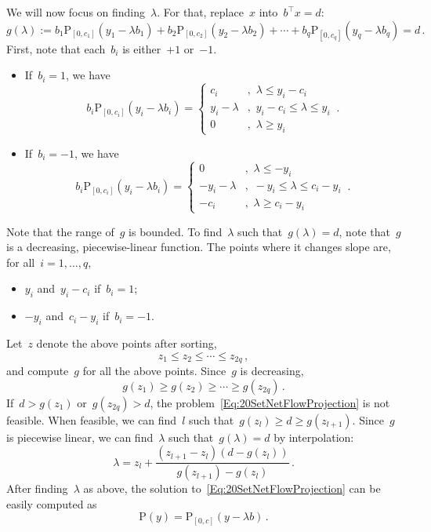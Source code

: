 \documentclass[letter,10pt]{article}
\theoremstyle{definition}
\theoremstyle{nonumberplain}
\begin{document}
		We will now focus on finding~$\lambda$. For that, replace~$x$ into~$b^\top x = d$:
		$$
			g(\lambda) := b_1\text{P}_{[0,c_1]}(y_1 - \lambda b_1) + b_2\text{P}_{[0,c_2]}(y_2 - \lambda b_2)
			+ \cdots + b_q\text{P}_{[0,c_q]}(y_q - \lambda b_q) = d\,.
		$$
		First, note that each~$b_i$ is either~$+1$ or~$-1$.
		\begin{itemize}
			\item If~$b_i=1$, we have
					$$
						b_i\text{P}_{[0,c_i]}(y_i - \lambda b_i) =
						\left\{
							\begin{array}{ll}
								c_i &,\,\, \lambda \leq y_i - c_i \\
								y_i - \lambda &,\,\, y_i - c_i \leq \lambda \leq y_i \\
								0 &,\,\, \lambda \geq y_i
							\end{array}
						\right.
						\,.
					$$
			\item If~$b_i = -1$, we have
				  $$
						b_i\text{P}_{[0,c_i]}(y_i - \lambda b_i) =
						\left\{
							\begin{array}{ll}
								0 &,\,\, \lambda \leq -y_i \\
								-y_i - \lambda &,\,\, -y_i \leq \lambda \leq c_i -y_i  \\
								-c_i &,\,\, \lambda \geq c_i -y_i
							\end{array}
						\right.
						\,.
					$$
		\end{itemize}
		Note that the range of~$g$ is bounded. 	To find~$\lambda$ such that~$g(\lambda) = d$, note that~$g$ is a decreasing, piecewise-linear function. The points where it changes slope are, for all~$i = 1, \ldots,q$,
		\begin{itemize}
			\item $y_i$ and~$y_i-c_i$ if~$b_i = 1$;
			\item $-y_i$ and~$c_i-y_i$ if~$b_i=-1$.
		\end{itemize}
	  Let~$z$ denote the above points after sorting,
	  $$
			z_1 \leq z_2 \leq \cdots \leq z_{2q}\,,
	  $$
	  and compute~$g$ for all the above points. Since~$g$ is decreasing,
		$$
			g(z_1) \geq g(z_2) \geq \cdots \geq g(z_{2q})\,.
		$$
		If~$d > g(z_1)$ or~$g(z_{2q}) > d$, the problem~\eqref{Eq:20SetNetFlowProjection} is not feasible. When feasible, we can find~$l$ such that~$g(z_l) \geq d \geq g(z_{l+1})$. Since~$g$ is piecewise linear,
		we can find~$\lambda$ such that~$g(\lambda) = d$ by interpolation:
		$$
			\lambda = z_l + \frac{(z_{l+1} - z_l)(d - g(z_l))}{g(z_{l+1}) - g(z_l)}\,.
		$$
		After finding~$\lambda$ as above, the solution to~\eqref{Eq:20SetNetFlowProjection} can be easily computed as
		$$
			\text{P}(y) = \text{P}_{[0,c]}(y - \lambda b)\,.
		$$
\end{document}
